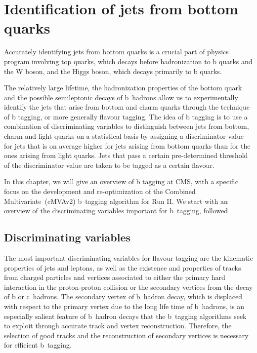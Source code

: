 \chapter{Identification of jets from bottom quarks}
Accurately identifying jets from bottom quarks is a crucial part of physics program involving top quarks, which decays before hadronization to b quarks and the W boson, and the Higgs boson, which decays primarily to b quarks.

The relatively large lifetime, the hadronization properties of the bottom quark and the possible semileptonic decays of b~hadrons allow us to experimentally identify the jets that arise from bottom and charm quarks through the technique of b tagging, or more generally flavour tagging. The idea of b tagging is to use a combination of discriminating variables to distinguish between jets from bottom, charm and light quarks on a statistical basis by assigning a discriminator value for jets that is on average higher for jets arising from bottom quarks than for the ones arising from light quarks. Jets that pass a certain pre-determined threshold of the discriminator value are taken to be tagged as a certain flavour.

In this chapter, we will give an overview of b tagging at CMS, with a specific focus on the development and re-optimization of the Combined Multivariate~(cMVAv2) b~tagging algorithm for Run II. We start with an overview of the discriminating variables important for b~tagging, followed 

\section{Discriminating variables}
The most important discriminating variables for flavour tagging are the kinematic properties of jets and leptons, as well as the existence and properties of tracks from charged particles and vertices associated to either the primary hard interaction in the proton-proton collision or the secondary vertices from the decay of b or c~hadrons. The secondary vertex of b~hadron decay, which is displaced with respect to the primary vertex due to the long life time of b~hadrons, is an especially salient feature of b~hadron decays that the b~tagging algorithms seek to exploit through accurate track and vertex reconstruction. Therefore, the selection of good tracks and the reconstruction of secondary vertices is necessary for efficient b~tagging.

